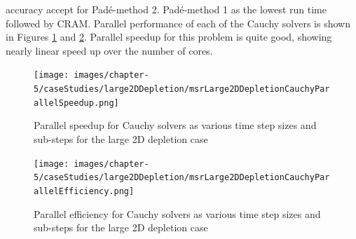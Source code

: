 \clearpage

\noindent accuracy accept for Pad\'e-method 2. Pad\'e-method 1 as the lowest run time followed by CRAM. Parallel performance of each of the Cauchy solvers is shown in Figures \ref{fig:large_2D_depletion_cauchy_speedup} and \ref{fig:large_2D_depletion_cauchy_parallel_eff}. Parallel speedup for this problem is quite good, showing nearly linear speed up over the number of cores. 

\clearpage

\begin{figure}[p]
    \centering
    \texttt{[image: images/chapter-5/caseStudies/large2DDepletion/msrLarge2DDepletionCauchyParallelSpeedup.png]}
    \caption{Parallel speedup for Cauchy solvers as various time step sizes and sub-steps for the large 2D depletion case}
    \label{fig:large_2D_depletion_cauchy_speedup}
\end{figure}

\clearpage

\begin{figure}[p]
    \centering
    \texttt{[image: images/chapter-5/caseStudies/large2DDepletion/msrLarge2DDepletionCauchyParallelEfficiency.png]}
    \caption{Parallel efficiency for Cauchy solvers as various time step sizes and sub-steps for the large 2D depletion case}
    \label{fig:large_2D_depletion_cauchy_parallel_eff}
\end{figure}